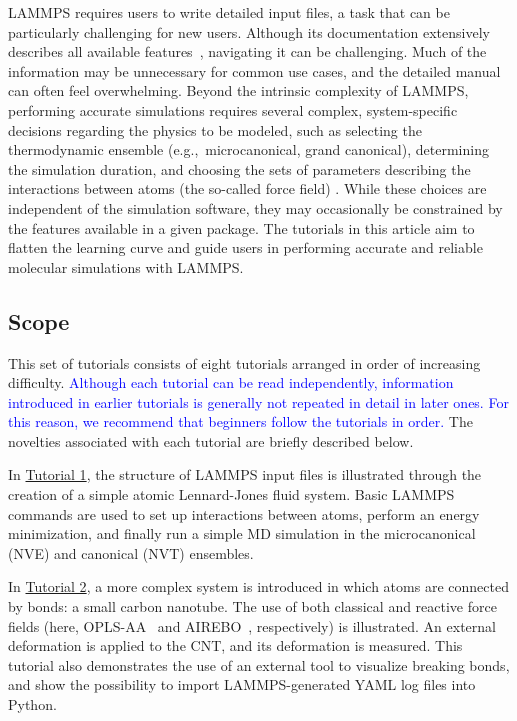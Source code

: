\documentclass[9pt,tutorial]{livecoms}
\begin{document}
LAMMPS requires users to write detailed input files, a task that can be
particularly challenging for new users.  Although its documentation
extensively describes all available features~\cite{lammps_docs},
navigating it can be challenging.  Much of the information may be
unnecessary for common use cases, and the detailed manual can often feel
overwhelming.  Beyond the intrinsic complexity of LAMMPS, performing
accurate simulations requires several complex, system-specific decisions
regarding the physics to be modeled, such as selecting the thermodynamic
ensemble (e.g.,~microcanonical, grand canonical), determining the
simulation duration, and choosing the sets of parameters describing the
interactions between atoms (the so-called force field)
\cite{wong2016good, van2018validation, prasad2018best}.  While these
choices are independent of the simulation software, they may
occasionally be constrained by the features available in a given
package.  The tutorials in this article aim to flatten the learning
curve and guide users in performing accurate and reliable molecular
simulations with LAMMPS.

\subsection{Scope}

This set of tutorials consists of eight tutorials arranged in order of
increasing difficulty.  \textcolor{blue}{Although each tutorial can be
read independently, information introduced in earlier tutorials is
generally not repeated in detail in later ones. For this reason, we
recommend that beginners follow the tutorials in order.}  The novelties
associated with each tutorial are briefly described below.

In \hyperref[lennard-jones-label]{Tutorial 1}, the structure of LAMMPS
input files is illustrated through the creation of a simple atomic
Lennard-Jones fluid system.  Basic LAMMPS commands are used to set up
interactions between atoms, perform an energy minimization, and finally
run a simple MD simulation in the microcanonical (NVE) and canonical (NVT)
ensembles.

In \hyperref[carbon-nanotube-label]{Tutorial 2}, a more complex system
is introduced in which atoms are connected by bonds: a small carbon
nanotube.  The use of both classical and reactive force fields (here,
OPLS-AA~\cite{jorgensenDevelopmentTestingOPLS1996} and
AIREBO~\cite{stuart2000reactive}, respectively) is illustrated.  An
external deformation is applied to the CNT, and its deformation is
measured.  This tutorial also demonstrates the use of an external tool
to visualize breaking bonds, and show the possibility to import
LAMMPS-generated YAML log files into Python.
\end{document}
